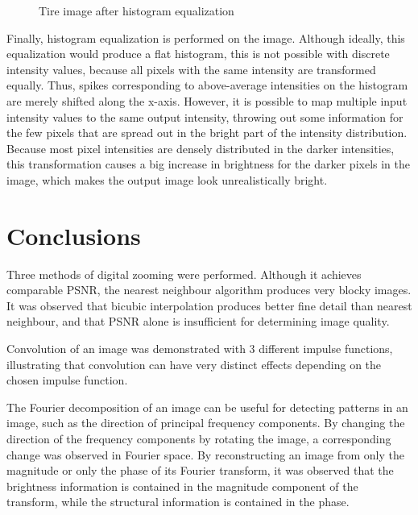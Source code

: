 \documentclass{sydeStyle}
\begin{document}
 \begin{figure}
	\begin{center}
	\end{center}
	\caption{Tire image after histogram equalization}
\end{figure}
Finally, histogram equalization is performed on the image.
Although ideally, this equalization would produce a flat histogram, this is not
possible with discrete intensity values, because all pixels with the same
intensity are transformed equally.
Thus, spikes corresponding to above-average intensities on the histogram are
merely shifted along the x-axis.
However, it is possible to map multiple input intensity values to the same
output intensity, throwing out some information for the few pixels that are
spread out in the bright part of the intensity distribution.
Because most pixel intensities are densely distributed in the darker
intensities, this transformation causes a big increase in brightness for the
darker pixels in the image, which makes the output image look unrealistically
bright.

\section*{Conclusions}
Three methods of digital zooming were performed.  Although it achieves
comparable
PSNR, the nearest neighbour algorithm produces very blocky images.  It was
observed that bicubic interpolation produces better fine detail than
nearest neighbour, and that PSNR alone is insufficient for determining image
quality.

Convolution of an image was demonstrated with 3 different impulse functions,
illustrating that convolution can have very distinct effects depending on the
chosen impulse function.

The Fourier decomposition of an image can be useful for detecting patterns
in an image, such as the direction of principal frequency components.
By changing the direction of the frequency components by rotating the image,
a corresponding change was observed in Fourier space.
By reconstructing an image from only the magnitude or only the phase of its
Fourier transform, it was observed that the brightness information is contained
in the magnitude component of the transform, while the structural information
is contained in the phase.
\end{document}
